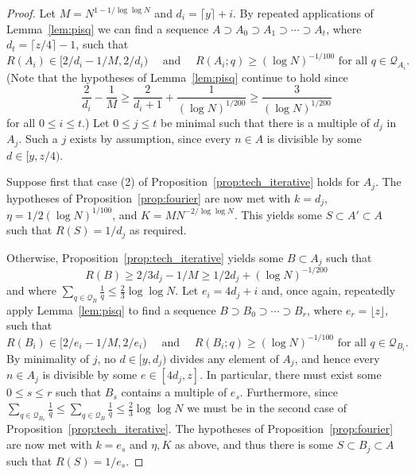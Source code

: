 \begin{proof}
Let $M=N^{1-1/\log\log N}$ and $d_i = \lceil y \rceil +i$. By repeated applications of Lemma~\ref{lem:pisq} we can find a sequence $A\supset A_0\supset A_1\supset\cdots \supset A_{t}$, where $d_t=\lceil z/4\rceil-1$, such that
\[R(A_i)\in [2/d_i-1/M,2/d_i)\quad\textrm{ and }\quad R(A_i;q)\geq (\log N)^{-1/100}\textrm{ for all }q\in \mathcal{Q}_{A_i}.\]
(Note that the hypotheses of Lemma~\ref{lem:pisq} continue to hold since 
\[\frac{2}{d_i}-\frac{1}{M}\geq \frac{2}{d_{i}+1}+\frac{1}{(\log N)^{1/200}}\geq \frac{3}{(\log N)^{1/200}}\]
for all $0\leq i\leq t$.) Let $0\leq j\leq t$ be minimal such that there is a multiple of $d_j$ in $A_j$. Such a $j$ exists by assumption, since every $n\in A$ is divisible by some $d\in[y,z/4)$. 

Suppose first that case (2) of Proposition~\ref{prop:tech_iterative} holds for $A_j$. The hypotheses of Proposition~\ref{prop:fourier} are now met with $k=d_j$, $\eta=1/2(\log N)^{1/100}$, and $K=MN^{-2/\log \log N}$. This yields some $S\subset A'\subset A$ such that $R(S)=1/d_j$ as required.

Otherwise, Proposition~\ref{prop:tech_iterative} yields some $B\subset A_j$ such that 
\[R(B)\geq 2/3d_j-1/M\geq 1/2d_j+(\log N)^{-1/200}\]
and where $\sum_{q\in\mathcal{Q}_B}\frac{1}{q}\leq \frac{2}{3}\log\log N$. Let $e_i = 4d_j+i$ and, once again, repeatedly apply Lemma~\ref{lem:pisq} to find a sequence $B\supset B_0\supset \cdots\supset B_r$, where $e_r=\lfloor z\rfloor$, such that
\[R(B_i)\in [2/e_i-1/M,2/e_i)\quad\textrm{ and }\quad R(B_i;q)\geq (\log N)^{-1/100}\textrm{ for all }q\in \mathcal{Q}_{B_i}.\]
By minimality of $j$, no $d\in [y,d_j)$ divides any element of $A_j$, and hence every $n\in A_j$ is divisible by some $e\in [4d_j,z]$. In particular, there must exist some $0\leq s\leq r$ such that $B_s$ contains a multiple of $e_s$. Furthermore, since $\sum_{q\in \mathcal{Q}_{B_s}}\frac{1}{q}\leq \sum_{q\in\mathcal{Q}_B}\frac{1}{q}\leq \frac{2}{3}\log\log N$ we must be in the second case of Proposition~\ref{prop:tech_iterative}. The hypotheses of Proposition~\ref{prop:fourier} are now met with $k=e_s$ and $\eta,K$ as above, and thus there is some $S\subset B_j\subset A$ such that $R(S)=1/e_s$. 
\end{proof}












